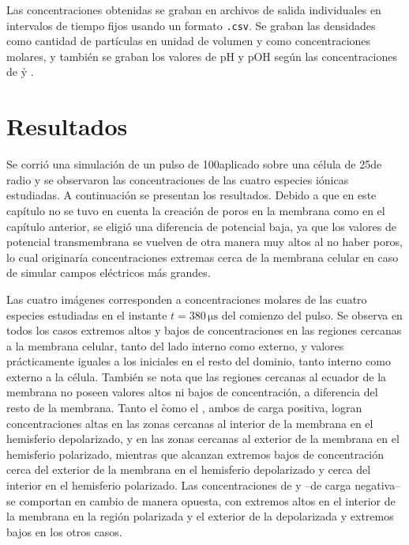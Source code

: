 Las concentraciones obtenidas se graban en archivos de salida individuales en intervalos de tiempo fijos usando un formato \texttt{.csv}. Se graban las densidades como cantidad de partículas en unidad de volumen y como concentraciones molares, y también se graban los valores de pH y pOH según las concentraciones de \h y \oh. 


\section{Resultados}

Se corrió una simulación de un pulso de 100\vcm aplicado sobre una célula de 25\um de radio y se observaron las concentraciones de las cuatro especies iónicas estudiadas. A continuación se presentan los resultados. Debido a que en este capítulo no se tuvo en cuenta la creación de poros en la membrana como en el capítulo anterior, se eligió una diferencia de potencial baja, ya que los valores de potencial transmembrana se vuelven de otra manera muy altos al no haber poros, lo cual originaría concentraciones extremas cerca de la membrana celular en caso de simular campos eléctricos más grandes.



Las cuatro imágenes corresponden a concentraciones molares de las cuatro especies estudiadas en el instante $t = 380 \, \si{\micro\second}$ del comienzo del pulso. Se observa en todos los casos extremos altos y bajos de concentraciones en las regiones cercanas a la membrana celular, tanto del lado interno como externo, y valores prácticamente iguales a los iniciales en el resto del dominio, tanto interno como externo a la célula. También se nota que las regiones cercanas al ecuador de la membrana no poseen valores altos ni bajos de concentración, a diferencia del resto de la membrana. Tanto el \h como el \na, ambos de carga positiva, logran concentraciones altas en las zonas cercanas al interior de la membrana en el hemisferio depolarizado, y en las zonas cercanas al exterior de la membrana en el hemisferio polarizado, mientras que alcanzan extremos bajos de concentración cerca del exterior de la membrana en el hemisferio depolarizado y cerca del interior en el hemisferio polarizado. Las concentraciones de \oh y \cl --de carga negativa-- se comportan en cambio de manera opuesta, con extremos altos en el interior de la membrana en la región polarizada y el exterior de la depolarizada y extremos bajos en los otros casos. \\

